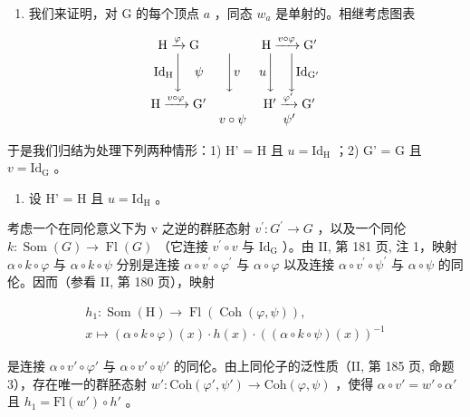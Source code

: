 \begin{enumerate}
\def\labelenumi{\alph{enumi})}
\setcounter{enumi}{2}
\tightlist
\item
  我们来证明，对 G 的每个顶点 \(a\) ，同态 \(w_{a}\) 是单射的。相继考虑图表
\end{enumerate}

\[
\begin{array}{c c c} \mathrm{H} \xrightarrow {\varphi} \mathrm{G} & & \mathrm{H} \xrightarrow {v \circ \varphi} \mathrm{G} ^ {\prime} \\ \mathrm{Id} _ {\mathrm{H}} \Biggl \downarrow \quad \psi & \Biggl \downarrow v & u \Biggl \downarrow \quad \Biggl \downarrow \mathrm{Id} _ {\mathrm{G} ^ {\prime}} \\ \mathrm{H} \xrightarrow {v \circ \varphi} \mathrm{G} ^ {\prime} & & \mathrm{H} ^ {\prime} \xrightarrow {\varphi^ {\prime}} \mathrm{G} ^ {\prime} \\ & v \circ \psi & \psi^ {\prime} \end{array}
\]

于是我们归结为处理下列两种情形：1) H' = H 且 \(u = \mathrm{Id}_{\mathrm{H}}\) ；2) G' = G 且 \(v = \mathrm{Id}_{\mathrm{G}}\) 。

\begin{enumerate}
\def\labelenumi{\arabic{enumi})}
\tightlist
\item
  设 H' = H 且 \(u = \mathrm{Id}_{\mathrm{H}}\) 。
\end{enumerate}

考虑一个在同伦意义下为 v 之逆的群胚态射 \(v^{\prime}: G^{\prime} \to G\) ，以及一个同伦 \(k: \operatorname{Som}(G) \to \operatorname{Fl}(G)\) （它连接 \(v^{\prime} \circ v\) 与 \(\mathrm{Id}_{\mathrm{G}}\) ）。由 II, 第 181 页, 注 1，映射 \(\alpha \circ k \circ \varphi\) 与 \(\alpha \circ k \circ \psi\) 分别是连接 \(\alpha \circ v^{\prime} \circ \varphi^{\prime}\) 与 \(\alpha \circ \varphi\) 以及连接 \(\alpha\circ v^{\prime}\circ\psi^{\prime}\) 与 \(\alpha\circ\psi\) 的同伦。因而（参看 II, 第 180 页），映射

\[
\begin{array}{c} h _ {1} \colon \operatorname{Som} (\mathrm{H}) \to \operatorname{Fl} (\operatorname{Coh} (\varphi , \psi)), \\ x \mapsto (\alpha \circ k \circ \varphi) (x) \cdot h (x) \cdot ((\alpha \circ k \circ \psi) (x)) ^ {- 1} \end{array}
\]

是连接 \(\alpha \circ v' \circ \varphi'\) 与 \(\alpha \circ v' \circ \psi'\) 的同伦。由上同伦子的泛性质（II, 第 185 页, 命题 3），存在唯一的群胚态射 \(w'\colon \mathrm{Coh}(\varphi', \psi') \to \mathrm{Coh}(\varphi, \psi)\) ，使得 \(\alpha \circ v' = w' \circ \alpha'\) 且 \(h_1 = \mathrm{Fl}(w') \circ h'\) 。

